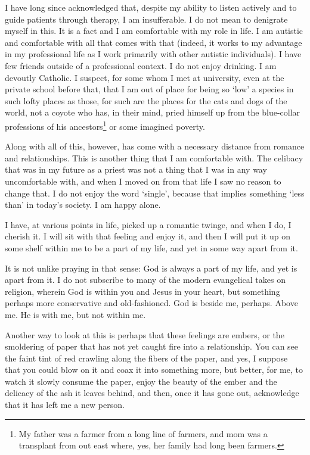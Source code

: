 I have long since acknowledged that, despite my ability to listen actively and to guide patients through therapy, I am insufferable. I do not mean to denigrate myself in this. It is a fact and I am comfortable with my role in life. I am autistic and comfortable with all that comes with that (indeed, it works to my advantage in my professional life as I work primarily with other autistic individuals). I have few friends outside of a professional context. I do not enjoy drinking. I am devoutly Catholic. I suspect, for some whom I met at university, even at the private school before that, that I am out of place for being so `low' a species in such lofty places as those, for such are the places for the cats and dogs of the world, not a coyote who has, in their mind, pried himself up from the blue-collar professions of his ancestors\footnote{My father was a farmer from a long line of farmers, and mom was a transplant from out east where, yes, her family had long been farmers.} or some imagined poverty.

Along with all of this, however, has come with a necessary distance from romance and relationships. This is another thing that I am comfortable with. The celibacy that was in my future as a priest was not a thing that I was in any way uncomfortable with, and when I moved on from that life I saw no reason to change that. I do not enjoy the word `single', because that implies something `less than' in today's society. I am happy alone.

I have, at various points in life, picked up a romantic twinge, and when I do, I cherish it. I will sit with that feeling and enjoy it, and then I will put it up on some shelf within me to be a part of my life, and yet in some way apart from it.

It is not unlike praying in that sense: God is always a part of my life, and yet is apart from it. I do not subscribe to many of the modern evangelical takes on religion, wherein God is within you and Jesus in your heart, but something perhaps more conservative and old-fashioned. God is beside me, perhaps. Above me. He is with me, but not within me.

Another way to look at this is perhaps that these feelings are embers, or the smoldering of paper that has not yet caught fire into a relationship. You can see the faint tint of red crawling along the fibers of the paper, and yes, I suppose that you could blow on it and coax it into something more, but better, for me, to watch it slowly consume the paper, enjoy the beauty of the ember and the delicacy of the ash it leaves behind, and then, once it has gone out, acknowledge that it has left me a new person.

